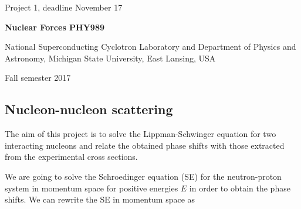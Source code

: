\documentclass[%
oneside,                 %
final,                   %
10pt]{article}
\begin{document}

\newcommand{\exercisesection}[1]{\subsection*{#1}}






\thispagestyle{empty}

\begin{center}
{\LARGE\bf
\begin{spacing}{1.25}
Project 1, deadline  November 17
\end{spacing}
}
\end{center}


\begin{center}
{\bf Nuclear Forces PHY989}
\end{center}

    \begin{center}
\centerline{{\small National Superconducting Cyclotron Laboratory and Department of Physics and Astronomy, Michigan State University, East Lansing, USA}}
\end{center}
    

\begin{center}
Fall semester 2017
\end{center}

\vspace{1cm}


\subsection{Nucleon-nucleon scattering}

The aim of this project is to solve the Lippman-Schwinger equation for two interacting nucleons and relate the obtained phase shifts with those extracted from the experimental cross sections.

We are going to solve the Schroedinger equation (SE) 
for the neutron-proton system 
in momentum space for positive energies $E$ in order to obtain
the phase shifts. 
We can rewrite the SE 
in momentum space as
\end{document}
